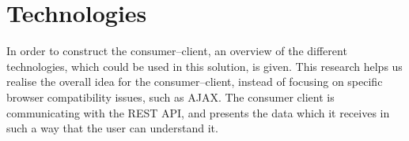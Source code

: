 \section{Technologies}\label{sec:technologies}
In order to construct the consumer--client, an overview of the different technologies, which could be used in this solution, is given.
This research helps us realise the overall idea for the consumer--client, instead of focusing on specific browser compatibility issues, such as \ac{AJAX}.
The consumer client is communicating with the REST API, and presents the data which it receives in such a way that the user can understand it.
